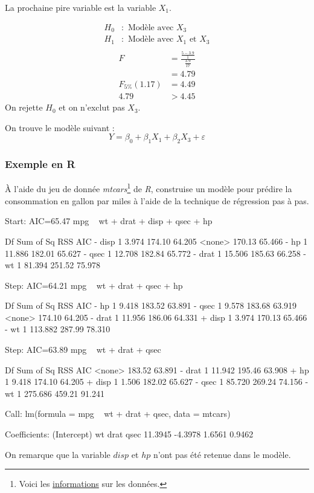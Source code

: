 \documentclass[11pt,french]{report}
\begin{document}
La prochaine pire variable est la variable $X_1$.

\begin{align*}
H_0 &: \text{ Modèle avec $X_3$} \\
H_1 &: \text{ Modèle avec $X_1$ et $X_3$} \\
\end{align*}
\begin{align*}
F &= \frac{\frac{5 - 3.9}{1}}{\frac{3.9}{17}} \\
&= 4.79 \\
F_{5 \%}(1.17) &= 4.49 \\
4.79 &> 4.45
\end{align*}
On rejette $H_0$ et on n'exclut pas $X_3$. \newline

On trouve le modèle suivant :
$$
Y = \beta_0 + \beta_1X_1 + \beta_2X_3 + \varepsilon
$$

\subsubsection*{Exemple en R}
À l'aide du jeu de donnée \emph{mtcars}\footnote{Voici les \href{https://stat.ethz.ch/R-manual/R-devel/library/datasets/html/mtcars.html}{informations} sur les données.} de \emph{R}, construise un modèle pour prédire la consommation en gallon par miles à l'aide de la technique de régression pas à pas. 
\begin{Schunk}
\begin{Soutput}
Start:  AIC=65.47
mpg ~ wt + drat + disp + qsec + hp

       Df Sum of Sq    RSS    AIC
- disp  1     3.974 174.10 64.205
<none>              170.13 65.466
- hp    1    11.886 182.01 65.627
- qsec  1    12.708 182.84 65.772
- drat  1    15.506 185.63 66.258
- wt    1    81.394 251.52 75.978

Step:  AIC=64.21
mpg ~ wt + drat + qsec + hp

       Df Sum of Sq    RSS    AIC
- hp    1     9.418 183.52 63.891
- qsec  1     9.578 183.68 63.919
<none>              174.10 64.205
- drat  1    11.956 186.06 64.331
+ disp  1     3.974 170.13 65.466
- wt    1   113.882 287.99 78.310

Step:  AIC=63.89
mpg ~ wt + drat + qsec

       Df Sum of Sq    RSS    AIC
<none>              183.52 63.891
- drat  1    11.942 195.46 63.908
+ hp    1     9.418 174.10 64.205
+ disp  1     1.506 182.02 65.627
- qsec  1    85.720 269.24 74.156
- wt    1   275.686 459.21 91.241

Call:
lm(formula = mpg ~ wt + drat + qsec, data = mtcars)

Coefficients:
(Intercept)           wt         drat         qsec  
    11.3945      -4.3978       1.6561       0.9462  
\end{Soutput}
\end{Schunk}
On remarque que la variable $disp$ et $hp$ n'ont pas été retenue dans le modèle.
\end{document}
